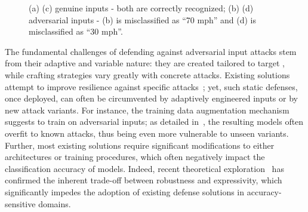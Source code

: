 \begin{figure}
    \centering
    \vspace{-5pt}
    \caption{(a) (c) genuine inputs - both are correctly recognized; (b) (d) adversarial inputs - (b) is misclassified as ``70 mph'' and (d) is misclassified as ``30 mph''.\label{fig:adv}}
\end{figure}




The fundamental challenges of defending against adversarial input attacks stem from their adaptive and variable nature: they are created tailored to target \dnns, while crafting strategies vary greatly with concrete attacks. Existing solutions attempt to improve \dnn resilience against specific attacks~\cite{Gu:2014:arxiv,Goodfellow:2014:arxiv,Huang:2015:arxiv,Shaham:2015:arxiv,Papernot:2016:sp}; yet, such static defenses, once deployed, can often be circumvented by adaptively engineered inputs or by new attack variants. For instance, the training data augmentation mechanism~\cite{Goodfellow:2014:arxiv,Nokland:2015:arXiv} suggests to train \dnns on adversarial inputs; as detailed in~, the resulting models often overfit to known attacks, thus being even more vulnerable to unseen variants. Further, most existing solutions require significant modifications to either \dnn architectures or training procedures, which often negatively impact the classification accuracy of \dnn models. Indeed, recent theoretical exploration~\cite{Fawzi:2015:arxiv} has confirmed the inherent trade-off between \dnn robustness and expressivity, which significantly impedes the adoption of existing defense solutions in accuracy-sensitive domains.




